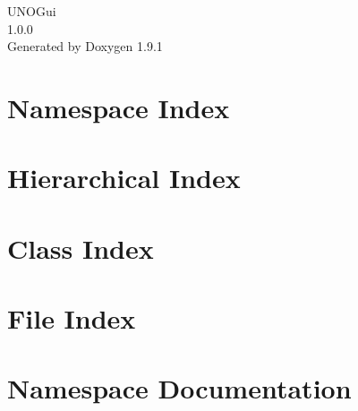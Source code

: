 \let\mypdfximage\pdfximage\def\pdfximage{\immediate\mypdfximage}\documentclass[twoside]{book}
\newcommand{\+}{\discretionary{\mbox{\scriptsize$\hookleftarrow$}}{}{}}
\newcommand{\clearemptydoublepage}{%
  \newpage{\pagestyle{empty}\cleardoublepage}%
}
\begin{document}
\raggedbottom

\begin{titlepage}
\vspace*{7cm}
\begin{center}%
{\Large UNOGui \\[1ex]\large 1.\+0.\+0 }\\
\vspace*{1cm}
{\large Generated by Doxygen 1.9.1}\\
\end{center}
\end{titlepage}
\clearemptydoublepage
{}
\tableofcontents
\clearemptydoublepage
{}

\chapter{Namespace Index}

\chapter{Hierarchical Index}

\chapter{Class Index}

\chapter{File Index}

\chapter{Namespace Documentation}






\end{document}
